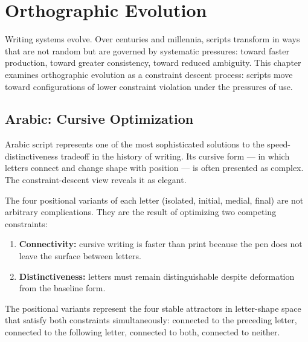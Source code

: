 \chapter{Orthographic Evolution}



Writing systems evolve. Over centuries and millennia, scripts transform
in ways that are not random but are governed by systematic pressures:
toward faster production, toward greater consistency, toward reduced
ambiguity. This chapter examines orthographic evolution as a constraint
descent process: scripts move toward configurations of lower constraint
violation under the pressures of use.

\section{Arabic: Cursive Optimization}

Arabic script represents one of the most sophisticated solutions to
the speed-distinctiveness tradeoff in the history of writing. Its
cursive form — in which letters connect and change shape with position
— is often presented as complex. The constraint-descent view reveals
it as elegant.

The four positional variants of each letter (isolated, initial, medial,
final) are not arbitrary complications. They are the result of optimizing
two competing constraints:
\begin{enumerate}
  \item \textbf{Connectivity:} cursive writing is faster than print
        because the pen does not leave the surface between letters.
  \item \textbf{Distinctiveness:} letters must remain distinguishable
        despite deformation from the baseline form.
\end{enumerate}

The positional variants represent the four stable attractors in
letter-shape space that satisfy both constraints simultaneously:
connected to the preceding letter, connected to the following letter,
connected to both, connected to neither.

